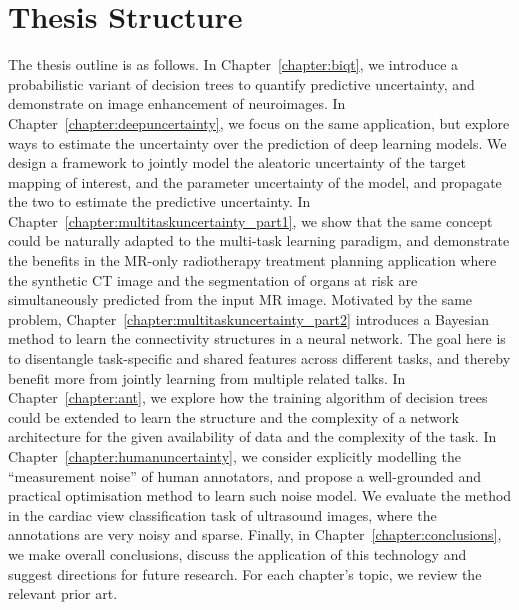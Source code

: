 \section*{Thesis Structure}
The thesis outline is as follows. In Chapter~\ref{chapter:biqt}, we introduce a probabilistic variant of decision trees to quantify predictive uncertainty, and demonstrate on image enhancement of neuroimages. In Chapter~\ref{chapter:deepuncertainty}, we focus on the same application, but explore ways to estimate the uncertainty over the prediction of deep learning models. We design a framework to jointly model the aleatoric uncertainty of the target mapping of interest, and the parameter uncertainty of the model, and propagate the two to estimate the predictive uncertainty. In Chapter~\ref{chapter:multitaskuncertainty_part1}, we show that the same concept could be naturally adapted to the multi-task learning paradigm, and demonstrate the benefits in the MR-only radiotherapy treatment planning application where the synthetic CT image and the segmentation of organs at risk are simultaneously predicted from the input MR image. Motivated by the same problem, Chapter~\ref{chapter:multitaskuncertainty_part2} introduces a Bayesian method to learn the connectivity structures in a neural network. The goal here is to disentangle task-specific and shared features across different tasks, and thereby benefit more from jointly learning from multiple related talks. In Chapter~\ref{chapter:ant}, we explore how the training algorithm of decision trees could be extended to learn the structure and the complexity of a network architecture for the given availability of data and the complexity of the task. In Chapter~\ref{chapter:humanuncertainty}, we consider explicitly modelling the ``measurement noise'' of human annotators, and propose a well-grounded and practical optimisation method to learn such noise model. We evaluate the method in the cardiac view classification task of ultrasound images, where the annotations are very noisy and sparse. Finally, in Chapter~\ref{chapter:conclusions}, we make overall conclusions, discuss the application of this technology and suggest directions for future research. For each chapter’s topic, we review the relevant prior art. 

